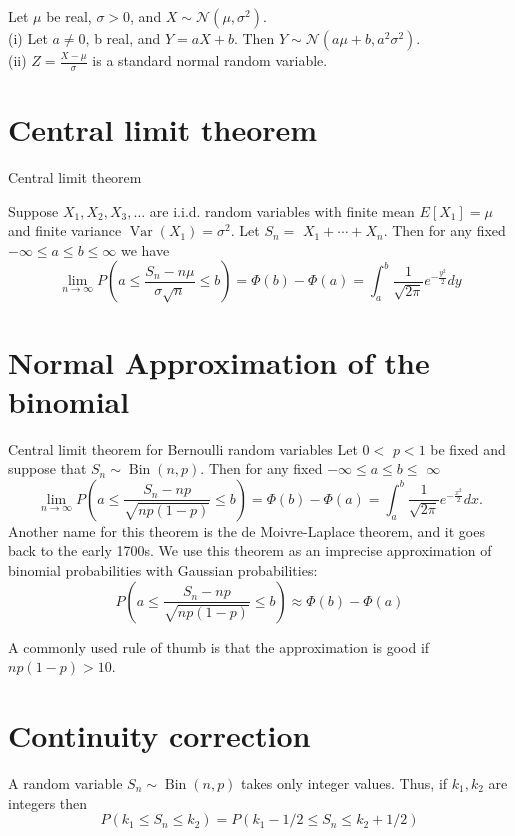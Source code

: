 \documentclass[11pt]{elegantbook}
\begin{document}
\begin{proposition}
Let $\mu$ be real, $\sigma>0$, and $X \sim \mathcal{N}\left(\mu, \sigma^2\right)$.\\
(i) Let $a \neq 0$, b real, and $Y=a X+b$. Then $Y \sim \mathcal{N}\left(a \mu+b, a^2 \sigma^2\right)$.\\
(ii) $Z=\frac{X-\mu}{\sigma}$ is a standard normal random variable.
\end{proposition}
\section{ Central limit theorem}
\begin{theorem}{ Central limit theorem}

 Suppose $X_1, X_2, X_3, \ldots$ are i.i.d. random variables with finite mean $E\left[X_1\right]=\mu$ and finite variance $\operatorname{Var}\left(X_1\right)=\sigma^2$. Let $S_n=$ $X_1+\cdots+X_n$. Then for any fixed $-\infty \leq a \leq b \leq \infty$ we have
$$
\lim _{n \rightarrow \infty} P\left(a \leq \frac{S_n-n \mu}{\sigma \sqrt{n}} \leq b\right)=\Phi(b)-\Phi(a)=\int_a^b \frac{1}{\sqrt{2 \pi}} e^{-\frac{y^2}{2}} d y
$$
\end{theorem}

\section{Normal Approximation of the binomial}
\begin{theorem}{Central limit theorem for Bernoulli random variables}
 Let $0<$ $p<1$ be fixed and suppose that $S_n \sim \operatorname{Bin}(n, p)$. Then for any fixed $-\infty \leq a \leq b \leq$ $\infty$
$$
\lim _{n \rightarrow \infty} P\left(a \leq \frac{S_n-n p}{\sqrt{n p(1-p)}} \leq b\right)=\Phi(b)-\Phi(a)=\int_a^b \frac{1}{\sqrt{2 \pi}} e^{-\frac{x^2}{2}} d x .
$$
Another name for this theorem is the de Moivre-Laplace theorem, and it goes back to the early 1700s. We use this theorem as an imprecise approximation of binomial probabilities with Gaussian probabilities:
$$
P\left(a \leq \frac{S_n-n p}{\sqrt{n p(1-p)}} \leq b\right) \approx \Phi(b)-\Phi(a)
$$
\end{theorem}
\begin{note}
    A commonly used rule of thumb is that the approximation is good if $n p(1-p)>10$.
\end{note}
\section{Continuity correction}
\begin{corollary}
A random variable $S_n \sim \operatorname{Bin}(n, p)$ takes only integer values. Thus, if $k_1, k_2$ are integers then
$$
P\left(k_1 \leq S_n \leq k_2\right)=P\left(k_1-1 / 2 \leq S_n \leq k_2+1 / 2\right)
$$
\end{corollary}
\end{document}
